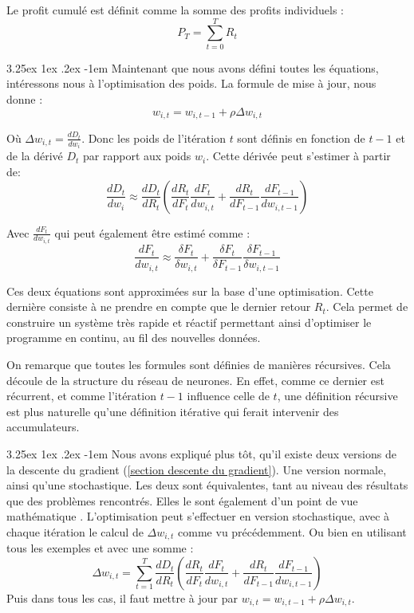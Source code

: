 \documentclass[a4paper, 11pt]{article}
\makeatletter
\renewcommand\paragraph{\@startsection{paragraph}{5}{\z@}%
  {3.25ex \@plus1ex \@minus.2ex}%
  {-1em}%
  {\normalfont\normalsize\bfseries}}
\makeatother
\begin{document}
Le profit cumulé est définit comme la somme des profits individuels :
$$P_T = \sum_{t=0}^T R_t$$

\paragraph{}
Maintenant que nous avons défini toutes les équations, intéressons nous à l'optimisation des poids. La formule de mise à jour, nous donne :
$$w_{i,t} = w_{i,t-1} + \rho \Delta w_{i,t}$$

Où $\Delta w_{i,t} = \frac{dD_t}{dw_i}$. Donc les poids de l'itération $t$ sont définis en fonction de $t-1$ et de la dérivé $D_t$ par rapport aux poids
$w_i$. Cette dérivée peut s'estimer à partir de:
$$\frac{dD_t}{dw_i} \approx \frac{dD_t}{dR_t} (\frac{dR_t}{dF_t} \frac{dF_t}{dw_{i,t}} + \frac{dR_t}{dF_{t-1}} \frac{dF_{t-1}}{dw_{i,t-1}})$$

Avec $\frac{dF_t}{dw_{i,t}}$ qui peut également être estimé comme :
$$\frac{dF_t}{dw_{i,t}} \approx \frac{\delta F_t}{\delta w_{i,t}} + \frac{\delta F_t}{\delta F_{t-1}} \frac{\delta F_{t-1}}{\delta w_{i,t-1}}$$

Ces deux équations sont approximées sur la base d'une optimisation\cite{learning_to_trade}. Cette dernière consiste à ne prendre en compte que le dernier retour $R_t$. Cela permet de construire un système très rapide et réactif permettant ainsi d'optimiser le programme en continu, au fil des nouvelles données.

On remarque que toutes les formules sont définies de manières récursives. Cela découle de la structure du réseau de neurones. En effet, comme ce dernier est
récurrent, et comme l'itération $t-1$ influence celle de $t$, une définition récursive est plus naturelle qu'une définition itérative qui ferait intervenir
des accumulateurs.

\paragraph{}
Nous avons expliqué plus tôt, qu'il existe deux versions de la descente du gradient (\ref{section descente du gradient}). Une version normale, ainsi qu'une stochastique.
Les deux sont équivalentes, tant au niveau des résultats que des problèmes rencontrés\cite{learning_to_trade}. Elles le sont également d'un point de vue mathématique
\cite{learning_to_trade}.
L'optimisation peut s'effectuer en version stochastique, avec à chaque itération le calcul de $\Delta w_{i,t}$ comme vu précédemment.
Ou bien en utilisant tous les exemples et avec une somme :
$$\Delta w_{i,t} = \sum_{t=1}^T \frac{dD_t}{dR_t} (\frac{dR_t}{dF_t} \frac{dF_t}{dw_{i,t}} + \frac{dR_t}{dF_{t-1}} \frac{dF_{t-1}}{dw_{i,t-1}})$$
Puis dans tous les cas, il faut mettre à jour par $w_{i,t} = w_{i,t-1} + \rho \Delta w_{i,t}$.
\end{document}
